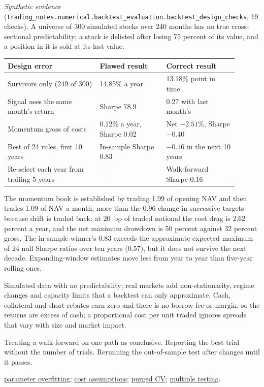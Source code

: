 \begin{qfmethod}
\emph{Synthetic evidence} (\nolinkurl{trading_notes.numerical.backtest_evaluation.backtest_design_checks}, 19 checks). A universe of 300 simulated stocks over 240 months has no true cross-sectional predictability; a stock is delisted after losing 75 percent of its value, and a position in it is sold at its last value.
\begin{center}\small
\begin{tabular}{@{}p{0.36\linewidth}p{0.26\linewidth}p{0.28\linewidth}@{}}
\toprule
Design error & Flawed result & Correct result \\
\midrule
Survivors only (249 of 300) & 14.85\% a year & 13.18\% point in time \\
Signal uses the same month's return & Sharpe 78.9 & 0.27 with last month's \\
Momentum gross of costs & 0.12\% a year, Sharpe 0.02 & Net $-2.51$\%, Sharpe $-0.40$ \\
Best of 24 rules, first 10 years & In-sample Sharpe 0.83 & $-0.16$ in the next 10 years \\
Re-select each year from trailing 5 years & --- & Walk-forward Sharpe 0.16 \\
\bottomrule
\end{tabular}
\end{center}
The momentum book is established by trading 1.99 of opening NAV and then trades 1.09 of NAV a month, more than the 0.96 change in successive targets because drift is traded back; at 20~bp of traded notional the cost drag is 2.62 percent a year, and the net maximum drawdown is 50 percent against 32 percent gross. The in-sample winner's 0.83 exceeds the approximate expected maximum of 24 null Sharpe ratios over ten years (0.57), but it does not survive the next decade. Expanding-window estimates move less from year to year than five-year rolling ones.

 Simulated data with no predictability; real markets add non-stationarity, regime changes and capacity limits that a backtest can only approximate. Cash, collateral and short rebates earn zero and there is no borrow fee or margin, so the returns are excess of cash; a proportional cost per unit traded ignores spreads that vary with size and market impact.

 Treating a walk-forward on one path as conclusive. Reporting the best trial without the number of trials. Rerunning the out-of-sample test after changes until it passes.

 \hyperref[pit:parameter-overfitting]{parameter overfitting}; \hyperref[pit:backtest-cost-short-assumptions]{cost assumptions}; \hyperref[meth:purged-embargoed-cross-validation]{purged CV}; \hyperref[meth:multiple-testing-control]{multiple testing}.

\end{qfmethod}

